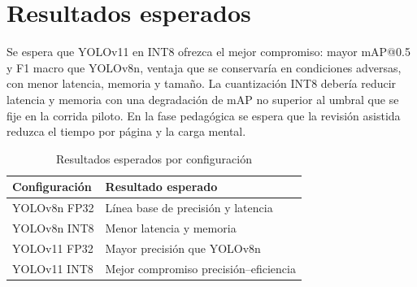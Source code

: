 \section{Resultados esperados}

Se espera que YOLOv11 en INT8 ofrezca el mejor compromiso: mayor mAP@0.5 y F1
macro que YOLOv8n, ventaja que se conservaría en condiciones adversas, con menor
latencia, memoria y tamaño. La cuantización INT8 debería reducir latencia y
memoria con una degradación de mAP no superior al umbral que se fije en la
corrida piloto. En la fase pedagógica se espera que la revisión asistida reduzca
el tiempo por página y la carga mental.

\begin{table}[H]
  \centering
  \caption{Resultados esperados por configuración}
  \label{tab:resultados}
  \small
  \begin{tabularx}{\columnwidth}{@{}lX@{}}
    \toprule
    \textbf{Configuración} & \textbf{Resultado esperado} \\
    \midrule
    YOLOv8n FP32 & Línea base de precisión y latencia \\
    YOLOv8n INT8 & Menor latencia y memoria \\
    YOLOv11 FP32 & Mayor precisión que YOLOv8n \\
    YOLOv11 INT8 & Mejor compromiso precisión--eficiencia \\
    \bottomrule
  \end{tabularx}
\end{table}
